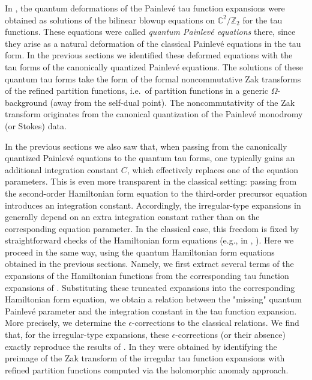 \documentclass[12pt,a4paper]{article}
\numberwithin{equation}{section}
\begin{document}
In \cite{BST25}, the quantum deformations of the Painlev\'e tau function expansions were obtained as solutions of the bilinear blowup equations on $\mathbb{C}^2/\mathbb{Z}_2$ for the tau functions. These equations were called \emph{quantum Painlev\'e equations} there, since they arise as a natural deformation of the classical Painlev\'e equations in the tau form. In the previous sections we identified these deformed equations with the tau forms of the canonically quantized Painlev\'e equations. The solutions of these quantum tau forms take the form of the formal noncommutative Zak transforms of the refined partition functions, i.e.\ of partition functions in a generic $\Omega$-background (away from the self-dual point). The noncommutativity of the Zak transform originates from the canonical quantization of the Painlev\'e monodromy (or Stokes) data.

In the previous sections we also saw that, when passing from the canonically quantized Painlev\'e equations to the quantum tau forms, one typically gains an additional integration constant $C$, which effectively replaces one of the equation parameters. This is even more transparent in the classical setting: passing from the second-order Hamiltonian form equation to the third-order precursor equation introduces an integration constant. Accordingly, the irregular-type expansions in \cite{BST25} generally depend on an extra integration constant rather than on the corresponding equation parameter. In the classical case, this freedom is fixed by straightforward checks of the Hamiltonian form equations (e.g., in \cite{GIL13}, \cite{BS14} \cite{BLMST16}). Here we proceed in the same way, using the quantum Hamiltonian form equations obtained in the previous sections. Namely, we first extract several terms of the expansions of the Hamiltonian functions from the corresponding tau function expansions of \cite{BST25}. Substituting these truncated expansions into the corresponding Hamiltonian form equation, we obtain a relation between the "missing" quantum Painlev\'e parameter and the integration constant in the tau function expansion. More precisely, we determine the $\epsilon$-corrections to the classical relations. We find that, for the irregular-type expansions, these $\epsilon$-corrections (or their absence) exactly reproduce the results of \cite[Sec.~5]{BST25}. In \cite{BST25} they were obtained by identifying the preimage of the Zak transform of the irregular tau function expansions with refined partition functions computed via the holomorphic anomaly approach.
\end{document}
